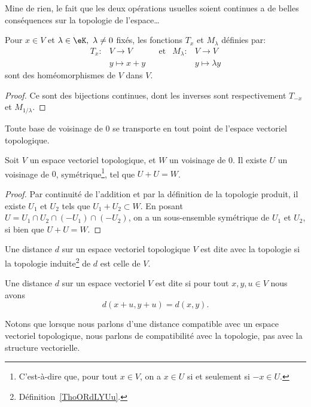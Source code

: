 Mine de rien, le fait que les deux opérations usuelles soient continues a de belles conséquences sur la topologie de l'espace\dots

\begin{proposition}
  Pour \(x \in V \) et \(\lambda \in \eK, \ \lambda \neq 0 \) fixés, les fonctions \( T_x \) et \( M_\lambda \) définies par:
  \begin{align}
    T_x:&V \to V & &\text{et}&M_\lambda:&V \to V\\
    & y \mapsto x+y & & & &y \mapsto \lambda y
  \end{align}
sont des homéomorphismes de \(V \) dans \(V \).
\end{proposition}

\begin{proof}
  Ce sont des bijections continues, dont les inverses sont respectivement \( T_{-x} \) et \( M_{1/\lambda} \).
\end{proof}

\begin{corollary}\label{PropInvarianceTopologie}
  Toute base de voisinage de \( 0 \) se transporte en tout point de l'espace vectoriel topologique.
\end{corollary}

\begin{lemma}\label{PropSommeTopologique}
  Soit \( V \) un espace vectoriel topologique, et \( W \) un voisinage de \( 0 \). Il existe \( U \) un voisinage de \( 0 \), symétrique\footnote{C'est-à-dire que, pour tout \( x \in V \), on a \( x \in U \) si et seulement si \( -x \in U \).}, tel que \( U + U = W \).
\end{lemma}

\begin{proof}
  Par continuité de l'addition et par la définition de la topologie produit, il existe \(U_1 \) et \(U_2 \) tels que \( U_1 + U_2 \subset W \). En posant \( U = U_1 \cap U_2 \cap (-U_1) \cap (-U_2) \), on a un sous-ensemble symétrique de \( U_1\) et \(U_2\), si bien que \( U + U = W \).
\end{proof}

\begin{definition}      \label{DEFooGTOZooRcvGHg}
    Une distance \( d\) sur un espace vectoriel topologique \( V\) est dite  avec la topologie si la topologie induite\footnote{Définition~\ref{ThoORdLYUu}.} de \( d\) est celle de \( V\).

    Une distance \( d\) sur un espace vectoriel \( V\) est dite  si pour tout \( x,y,u\in V\) nous avons
    \begin{equation}
        d(x+u,y+u)=d(x,y).
    \end{equation}
\end{definition}
Notons que lorsque nous parlons d'une distance compatible avec un espace vectoriel topologique, nous parlons de compatibilité avec la topologie, pas avec la structure vectorielle.

